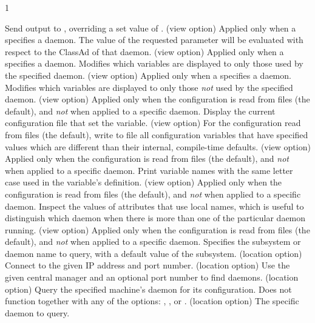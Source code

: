 \begin{ManPage}{\label{man-condor-config-val}}{1}
\begin{Options}
{    Send output to ,
    overriding a set value of . 
   }
   {(view option)
    Applied only when a  specifies a daemon.
    The value of the requested parameter will be evaluated with 
    respect to the ClassAd of that daemon.  
   }
   {(view option)
    Applied only when a  specifies a daemon.
    Modifies which variables are displayed to only those 
    used by the specified daemon.
   }
   {(view option)
    Applied only when a  specifies a daemon.
    Modifies which variables are displayed to only those \emph{not}
    used by the specified daemon.
   }
   {(view option)
    Applied only when the configuration is read from files (the default),
    and \emph{not} when applied to a specific daemon.
    Display the current configuration file that set the variable.
   }
   {(view option)
    For the configuration read from files (the default),
    write to file  all configuration variables that have
    specified values which are different than their internal, compile-time
    defaults.
   }
   {(view option)
    Applied only when the configuration is read from files (the default),
    and \emph{not} when applied to a specific daemon.
    Print variable names with the same letter case used in the 
    variable's definition.
   }
   {(view option) 
    Applied only when the configuration is read from files (the default),
    and \emph{not} when applied to a specific daemon.
    Inspect the values of attributes that use local names,
    which is useful to distinguish which daemon when there is more than
    one of the particular daemon running.}
   {(view option) 
    Applied only when the configuration is read from files (the default),
    and \emph{not} when applied to a specific daemon.
    Specifies the subsystem or daemon name to query, 
    with a default value of the  subsystem.
   }
   {(location option)
    Connect to the given IP address and port number. }
    {(location option) Use the given central manager and an optional 
    port number to find daemons. }
   { (location option)
    Query the specified
    machine's  daemon for its configuration. 
    Does not function together with any of the options:
    , , or . }
    {(location option) The specific daemon to query. }
\end{Options}


\end{ManPage}
